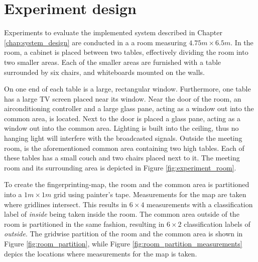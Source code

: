 \section{Experiment design}\label{sec:experiment_design}
Experiments to evaluate the implemented system described in Chapter \ref{chap:system_design} are conducted in a a room measuring $4.75m \times 6.5m$.
In the room, a cabinet is placed between two tables, effectively dividing the room into two smaller areas. 
Each of the smaller areas are furnished with a table surrounded by six chairs, and whiteboards mounted on the walls.

On one end of each table is a large, rectangular window.
Furthermore, one table has a large TV screen placed near its window. 
Near the door of the room, an airconditioning controller and a large glass pane, acting as a window out into the common area, is located. 
Next to the door is placed a glass pane, acting as a window out into the common area. 
Lighting is built into the ceiling, thus no hanging light will interfere with the broadcasted signals. 
Outside the meeting room, is the aforementioned common area containing two high tables.
Each of these tables has a small couch and two chairs placed next to it.
The meeting room and its surrounding area is depicted in Figure \ref{fig:experiment_room}.

To create the fingerprinting-map, the room and the common area is partitioned into a $1m \times 1m$ grid using painter's tape.
Measurements for the map are taken where gridlines intersect.
This results in $6 \times 4$ measurements with a classification label of \textit{inside} being taken inside the room.
The common area outside of the room is partitioned in the same fashion, resulting in  $6 \times 2$ classification labels of \textit{outside}. 
The gridwise partition of the room and the common area is shown in Figure \ref{fig:room_partition}, while Figure \ref{fig:room_partition_measurements} depics the locations where measurements for the map is taken.

